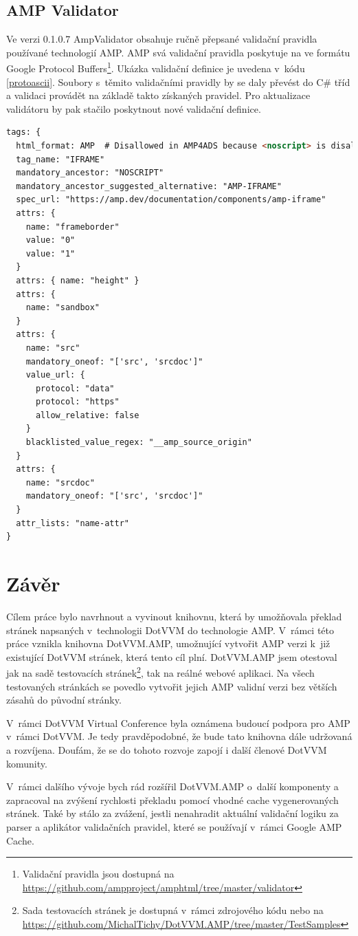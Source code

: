\section{AMP Validator}
Ve verzi 0.1.0.7 AmpValidator obsahuje ručně přepsané validační pravidla používané technologií AMP. AMP svá validační pravidla poskytuje na ve formátu Google Protocol Buffers\footnote{Validační pravidla jsou dostupná na \url{https://github.com/ampproject/amphtml/tree/master/validator}}. Ukázka validační definice je uvedena v~kódu \ref{protoascii}\cite{validatorGit}.  Soubory s~těmito validačními pravidly by se daly převést do C\# tříd a validaci provádět na základě takto získaných pravidel. Pro aktualizace validátoru by pak stačilo poskytnout nové validační definice.

\begin{lstlisting}[language=html, caption=Ukázka části validačního pravidla pro iframe v~rámci protoascii souboru.,label=protoascii,captionpos=t]
tags: {
  html_format: AMP  # Disallowed in AMP4ADS because <noscript> is disallowed.
  tag_name: "IFRAME"
  mandatory_ancestor: "NOSCRIPT"
  mandatory_ancestor_suggested_alternative: "AMP-IFRAME"
  spec_url: "https://amp.dev/documentation/components/amp-iframe"
  attrs: {
    name: "frameborder"
    value: "0"
    value: "1"
  }
  attrs: { name: "height" }
  attrs: {
    name: "sandbox"
  }
  attrs: {
    name: "src"
    mandatory_oneof: "['src', 'srcdoc']"
    value_url: {
      protocol: "data"
      protocol: "https"
      allow_relative: false
    }
    blacklisted_value_regex: "__amp_source_origin"
  }
  attrs: {
    name: "srcdoc"
    mandatory_oneof: "['src', 'srcdoc']"
  }
  attr_lists: "name-attr"
}
\end{lstlisting}

\chapter{Závěr}
Cílem práce bylo navrhnout a vyvinout knihovnu, která by umožňovala překlad stránek napsaných v~technologii DotVVM do technologie AMP. V~rámci této práce vznikla knihovna DotVVM.AMP, umožnující vytvořit AMP verzi k~již existující DotVVM stránek, která tento cíl plní. DotVVM.AMP jsem otestoval jak na sadě testovacích stránek\footnote{ Sada testovacích stránek je dostupná v~rámci zdrojového kódu nebo na \url{https://github.com/MichalTichy/DotVVM.AMP/tree/master/TestSamples}}, tak na reálné webové aplikaci. Na všech testovaných stránkách se povedlo vytvořit jejich AMP validní verzi bez větších zásahů do původní stránky.

V~rámci DotVVM Virtual Conference byla oznámena budoucí podpora pro AMP v~rámci DotVVM. Je tedy pravděpodobné, že bude tato knihovna dále udržovaná a rozvíjena\cite{herceg_2020}.  Doufám, že se do tohoto rozvoje zapojí i další členové DotVVM komunity.

V~rámci dalšího vývoje bych rád rozšířil DotVVM.AMP o~další komponenty a zapracoval na zvýšení rychlosti překladu pomocí vhodné cache vygenerovaných stránek. Také by stálo za zvážení, jestli nenahradit aktuální validační logiku za parser a aplikátor validačních pravidel, které se používají v~rámci Google AMP Cache.